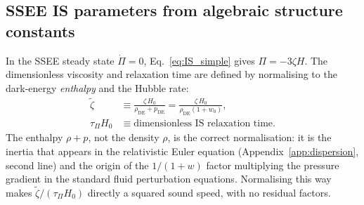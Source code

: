\documentclass[12pt,a4paper]{article}
\newcommand{\wz}{w_0}
\newcommand{\tauPi}{\tau_\Pi}
\newcommand{\ztilde}{\tilde{\zeta}}
\begin{document}
\subsection{SSEE IS parameters from algebraic structure constants}
\label{subsec:IS_params}

In the SSEE steady state $\dot{\Pi}=0$, Eq.~\eqref{eq:IS_simple} gives
$\Pi = -3\zeta H$.
The dimensionless viscosity and relaxation time are defined by normalising to
the dark-energy \emph{enthalpy} and the Hubble rate:
\begin{align}
  \ztilde &\equiv \frac{\zeta\,H_0}{\rho_{\mathrm{DE}}+p_{\mathrm{DE}}}
           = \frac{\zeta\,H_0}{\rho_{\mathrm{DE}}(1+\wz)}, \\
  \tauPi H_0 &\equiv \text{dimensionless IS relaxation time}.
\end{align}
The enthalpy $\rho+p$, not the density $\rho$, is the correct normalisation:
it is the inertia that appears in the relativistic Euler equation
(Appendix~\ref{app:dispersion}, second line) and the origin of the $1/(1+w)$
factor multiplying the pressure gradient in the standard fluid perturbation
equations. Normalising this way makes $\ztilde/(\tauPi H_0)$ directly a squared
sound speed, with no residual factors.
\end{document}
